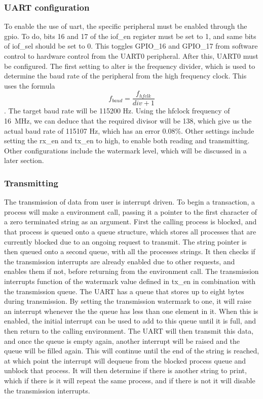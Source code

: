 \subsubsection{UART configuration}
To enable the use of \ac{uart}, the specific peripheral must be enabled through the \ac{gpio}. To do, bits 16 and 17 of the iof\_en register must be set to 1, and same bits of iof\_sel should be set to 0. This toggles GPIO\_16 and GPIO\_17 from software control to hardware control from the UART0 peripheral. After this, UART0 must be configured. The first setting to alter is the frequency divider, which is used to determine the baud rate of the peripheral from the high frequency clock. This uses the formula \[f_{baud}=\frac{f_{hfclk}}{div+1}\]. The target baud rate will be 115200 Hz. Using the hfclock frequency of 16~MHz, we can deduce that the required divisor will be 138, which give us the actual baud rate of 115107 Hz, which has an error 0.08\%. Other settings include setting the rx\_en and tx\_en to high, to enable both reading and transmitting. Other configurations include the watermark level, which will be discussed in a later section.
\subsubsection{Transmitting}
The transmission of data from user is interrupt driven. To begin a transaction, a process will make a environment call, passing it a pointer to the first character of a zero terminated string as an argument. First the calling process is blocked, and that process is queued onto a queue structure, which stores all processes that are currently blocked due to an ongoing request to transmit. The string pointer is then queued onto a second queue, with all the processes strings. It then checks if the transmission interrupts are already enabled due to other requests, and enables them if not, before returning from the environment call. The transmission interrupts function of the watermark value defined in tx\_en in combination with the transmission queue. The UART has a queue that stores up to eight bytes during transmission. By setting the transmission watermark to one, it will raise an interrupt whenever the the queue has less than one element in it. When this is enabled, the initial interrupt can be used to add to this queue until it is full, and then return to the calling environment. The UART will then transmit this data, and once the queue is empty again, another interrupt will be raised and the queue will be filled again. This will continue until the end of the string is reached, at which point the interrupt will dequeue from the blocked process queue and unblock that process. It will then determine if there is another string to print, which if there is it will repeat the same process, and if there is not it will disable the transmission interrupts.
